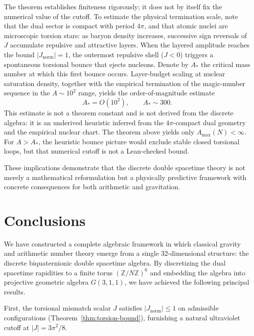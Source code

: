 \documentclass[a4paper]{article}
\theoremstyle{definition}
\theoremstyle{remark}
\newcommand{\Jnorm}{J_{\mathrm{norm}}}
\begin{document}
The theorem establishes finiteness rigorously; it does not by itself fix the numerical value of the cutoff. To estimate the physical termination scale, note that the dual sector is compact with period \(4\pi\), and that atomic nuclei are microscopic torsion stars: as baryon density increases, successive sign reversals of \(J\) accumulate repulsive and attractive layers. When the layered amplitude reaches the bound \(|\Jnorm| = 1\), the outermost repulsive shell (\(J < 0\)) triggers a spontaneous torsional bounce that ejects nucleons. Denote by \(A_*\) the critical mass number at which this first bounce occurs. Layer-budget scaling at nuclear saturation density, together with the empirical termination of the magic-number sequence in the \(A \sim 10^2\) range, yields the order-of-magnitude estimate
\[
A_* = O(10^2), \qquad A_* \sim 300.
\]
This estimate is not a theorem constant and is not derived from the discrete algebra: it is an underived heuristic inferred from the \(4\pi\)-compact dual geometry and the empirical nuclear chart. The theorem above yields only \(A_{\max}(N)<\infty\). For \(A > A_*\), the heuristic bounce picture would exclude stable closed torsional loops, but that numerical cutoff is not a Lean-checked bound.

These implications demonstrate that the discrete double spacetime theory is not merely a mathematical reformulation but a physically predictive framework with concrete consequences for both arithmetic and gravitation.

\section{Conclusions}

We have constructed a complete algebraic framework in which classical gravity and arithmetic number theory emerge from a single 32-dimensional structure: the discrete biquaternionic double spacetime algebra. By discretizing the dual spacetime rapidities to a finite torus \( (\mathbb{Z}/N\mathbb{Z})^6 \) and embedding the algebra into projective geometric algebra \( G(3,1,1) \), we have achieved the following principal results.

First, the torsional mismatch scalar \( J \) satisfies \(|\Jnorm| \leq 1\) on admissible configurations (Theorem~\ref{thm:torsion-bound}), furnishing a natural ultraviolet cutoff at \(|J| = 3\pi^2/8\).
\end{document}
